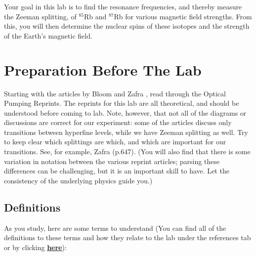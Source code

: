 \documentclass{../lab}
\newcommand{\DefinitionsOPT}{http://experimentationlab.berkeley.edu/definitionsopt}
\begin{document}
Your goal in this lab is to find the resonance frequencies, and thereby measure the Zeeman splitting, of $^{85}$Rb and $^{87}$Rb for various magnetic field strengths. From this, you will then determine the nuclear spins of these isotopes and the strength of the Earth's magnetic field.

\section{Preparation Before The Lab}

\newpage

Starting with the articles by Bloom \cite{Bloom} and Zafra \cite{Zafra}, read through the Optical Pumping Reprints. The reprints for this lab are all theoretical, and should be understood before coming to lab. Note, however, that not all of the diagrams or discussions are correct for our experiment: some of the articles discuss only transitions between hyperfine levels, while we have Zeeman splitting as well. Try to keep clear which splittings are which, and which are important for our transitions. See, for example, Zafra \cite{Zafra} (p.647). (You will also find that there is some variation in notation between the various reprint articles; parsing these differences can be challenging, but it is an important skill to have. Let the consistency of the underlying physics guide you.)

\subsection{Definitions}

As you study, here are some terms to understand (You can find all of the definitions to these terms and how they relate to the lab under the references tab or by clicking \href{\DefinitionsOPT}{\textbf{here}}):
\end{document}
